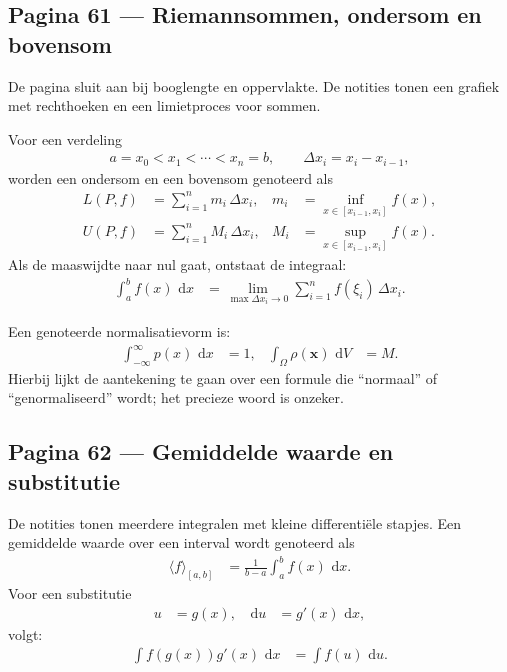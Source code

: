 \documentclass[11pt]{article}
\newcommand{\dd}{\,\mathrm{d}}
\newcommand{\vect}[1]{\mathbf{#1}}
\newcommand{\onzeker}[1]{\textcolor{red!70!black}{#1}}
\begin{document}
\newpage

\subsection*{Pagina 61 --- Riemannsommen, ondersom en bovensom}

De pagina sluit aan bij booglengte en oppervlakte. De notities tonen een grafiek met rechthoeken en een limietproces voor sommen.

Voor een verdeling
\begin{align*}
a=x_0<x_1<\cdots <x_n=b,
\qquad
\Delta x_i=x_i-x_{i-1},
\end{align*}
worden een ondersom en een bovensom genoteerd als
\begin{align*}
L(P,f)
&=
\sum_{i=1}^{n} m_i\,\Delta x_i,
&
m_i&=\inf_{x\in[x_{i-1},x_i]} f(x),\\
U(P,f)
&=
\sum_{i=1}^{n} M_i\,\Delta x_i,
&
M_i&=\sup_{x\in[x_{i-1},x_i]} f(x).
\end{align*}
Als de maaswijdte naar nul gaat, ontstaat de integraal:
\begin{align*}
\int_a^b f(x)\,\dd x
&=
\lim_{\max \Delta x_i\to 0}
\sum_{i=1}^{n} f(\xi_i)\,\Delta x_i.
\end{align*}

Een genoteerde normalisatievorm is:
\begin{align*}
\int_{-\infty}^{\infty} p(x)\,\dd x &= 1,
&
\int_{\Omega} \rho(\vect{x})\,\dd V &= M.
\end{align*}
Hierbij lijkt de aantekening te gaan over een formule die ``normaal'' of ``genormaliseerd'' wordt; het precieze woord is \onzeker{onzeker}.

\subsection*{Pagina 62 --- Gemiddelde waarde en substitutie}

De notities tonen meerdere integralen met kleine differentiële stapjes. Een gemiddelde waarde over een interval wordt genoteerd als
\begin{align*}
\langle f\rangle_{[a,b]}
&=
\frac{1}{b-a}\int_a^b f(x)\,\dd x.
\end{align*}
Voor een substitutie
\begin{align*}
u&=g(x),
&
\dd u&=g'(x)\,\dd x,
\end{align*}
volgt:
\begin{align*}
\int f(g(x))g'(x)\,\dd x
&=
\int f(u)\,\dd u.
\end{align*}
\end{document}
